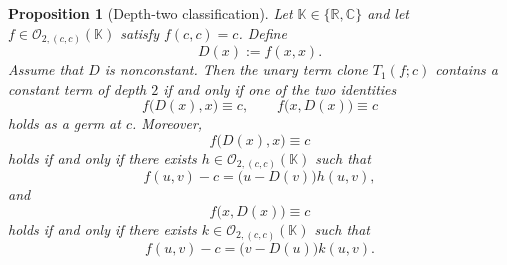 \documentclass[11pt]{amsart}
\numberwithin{equation}{section}
\newtheorem{proposition}[theorem]{Proposition}
\theoremstyle{remark}
\theoremstyle{definition}
\newcommand{\C}{\mathbb{C}}
\newcommand{\R}{\mathbb{R}}
\newcommand{\K}{\mathbb{K}}
\newcommand{\Oc}{\mathcal{O}}
\begin{document}
\begin{proposition}[Depth-two classification]\label{prop:depth-two-classification}
Let $\K\in\{\R,\C\}$ and let $f\in \Oc_{2,(c,c)}(\K)$ satisfy $f(c,c)=c$. Define
\[
D(x):=f(x,x).
\]
Assume that $D$ is nonconstant. Then the unary term clone $T_1(f;c)$ contains a constant term of depth $2$ if and only if one of the two identities
\begin{equation}\label{eq:left-right-traps}
f\bigl(D(x),x\bigr)\equiv c,\qquad f\bigl(x,D(x)\bigr)\equiv c
\end{equation}
holds as a germ at $c$. Moreover,
\[
f\bigl(D(x),x\bigr)\equiv c
\]
holds if and only if there exists $h\in \Oc_{2,(c,c)}(\K)$ such that
\begin{equation}\label{eq:left-divisibility}
f(u,v)-c=\bigl(u-D(v)\bigr)h(u,v),
\end{equation}
and
\[
f\bigl(x,D(x)\bigr)\equiv c
\]
holds if and only if there exists $k\in \Oc_{2,(c,c)}(\K)$ such that
\begin{equation}\label{eq:right-divisibility}
f(u,v)-c=\bigl(v-D(u)\bigr)k(u,v).
\end{equation}
\end{proposition}
\end{document}
